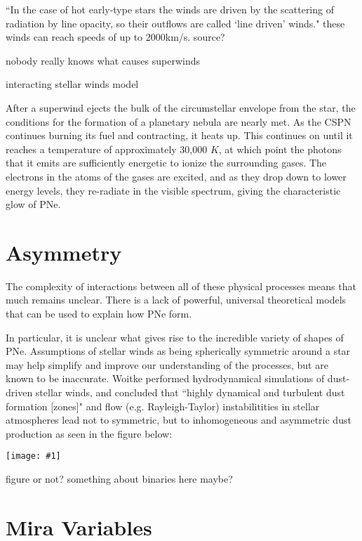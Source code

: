\documentclass[a4paper,11pt]{article}
\newcommand{\fig}[1]{\centerline{\texttt{[image: \#1]}}}
\begin{document}
``In the case of hot early-type stars the winds are driven by the scattering of radiation by line opacity, so their outflows are called ‘line driven’ winds." \cite{lamers} {\huge these winds can reach speeds of up to 2000km/s. source?}

{\huge nobody really knows what causes superwinds}

{\huge interacting stellar winds model}






After a superwind ejects the bulk of the circumstellar envelope from the star, the conditions for the formation of a planetary nebula are nearly met. As the CSPN continues burning its fuel and contracting, it heats up. This continues on until it reaches a temperature of approximately 30,000 $K$, at which point the photons that it emits are sufficiently energetic to ionize the surrounding gases. The electrons in the atoms of the gases are excited, and as they drop down to lower energy levels, they re-radiate in the visible spectrum, giving the characteristic glow of PNe.


\section{Asymmetry}

The complexity of interactions between all of these physical processes means that much remains unclear. There is a lack of powerful, universal theoretical models that can be used to explain how PNe form.

In particular, it is unclear what gives rise to the incredible variety of shapes of PNe. Assumptions of stellar winds as being spherically symmetric around a star may help simplify and improve our understanding of the processes, but are known to be inaccurate. Woitke performed hydrodynamical simulations of dust-driven stellar winds, and concluded that ``highly dynamical and turbulent dust formation [zones]" and flow (e.g. Rayleigh-Taylor) instabilitities \cite{woitke} in stellar atmospheres lead not to symmetric, but to inhomogeneous and asymmetric dust production as seen in the figure below:

\fig{dust_condensation}

{\huge figure or not? something about binaries here maybe?}

\section{Mira Variables}
\end{document}
